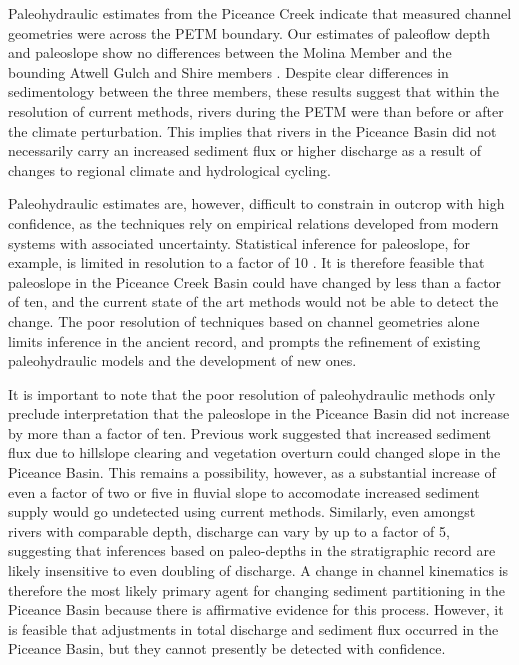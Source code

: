 \documentclass[draft]{compact_proposal}
\begin{document}

Paleohydraulic estimates from the Piceance Creek indicate that measured channel geometries were  across the PETM boundary.
Our estimates of paleoflow depth and paleoslope show no differences between the Molina Member and the bounding Atwell Gulch and Shire members .
Despite clear differences in sedimentology between the three members, these results suggest that within the resolution of current methods, rivers during the PETM were  than before or after the climate perturbation.
This implies that rivers in the Piceance Basin did not necessarily carry an increased sediment flux or higher discharge as a result of changes to regional climate and hydrological cycling.

Paleohydraulic estimates are, however, difficult to constrain in outcrop with high confidence, as the techniques rely on empirical relations developed from modern systems with associated uncertainty.
Statistical inference for paleoslope, for example, is limited in resolution to a factor of 10 \cnote.
It is therefore feasible that paleoslope in the Piceance Creek Basin could have changed by less than a factor of ten, and the current state of the art methods would not be able to detect the change.
The poor resolution of techniques based on channel geometries alone limits inference in the ancient record, and prompts the refinement of existing paleohydraulic models and the development of new ones.

It is important to note that the poor resolution of paleohydraulic methods only preclude interpretation that the paleoslope in the Piceance Basin did not increase by more than a factor of ten.
Previous work suggested that increased sediment flux due to hillslope clearing and vegetation overturn could changed slope in the Piceance Basin.
This remains a possibility, however, as a substantial increase of even a factor of two or five in fluvial slope to accomodate increased sediment supply would go undetected using current methods.
Similarly, even amongst rivers with comparable depth,  discharge can vary by up to a factor of 5, suggesting that inferences based on paleo-depths in the stratigraphic record are likely insensitive to even doubling of discharge.
A change in channel kinematics is therefore the most likely primary agent for changing sediment partitioning in the Piceance Basin because there is affirmative evidence for this process.
However, it is feasible that adjustments in total discharge and sediment flux occurred in the Piceance Basin, but they cannot presently be detected with confidence.
\end{document}
